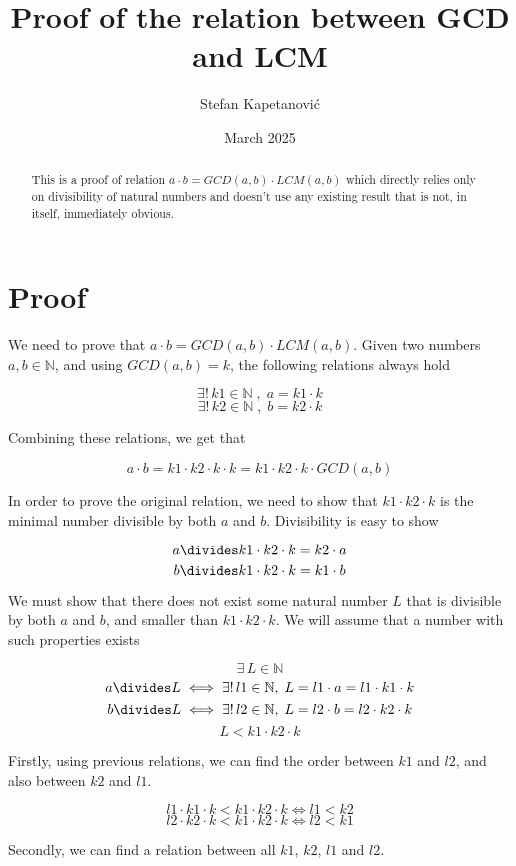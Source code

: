 \documentclass{article}
\title{Proof of the relation between GCD and LCM}
\author{ Stefan Kapetanović }
\date{March 2025}
\begin{document}
\maketitle

\begin{abstract}
This is a proof of relation $a \cdot b = GCD(a, b) \cdot LCM(a, b)$ which directly relies only on divisibility of natural numbers and doesn't use any existing result that is not, in itself, immediately obvious.
\end{abstract}

\section{Proof}

We need to prove that $a \cdot b = GCD(a, b) \cdot LCM(a, b)$.
Given two numbers $a, b \in \mathbb{N}$, and using $GCD(a, b) = k$, the following relations always hold

\[ \exists! \, k1 \in \mathbb{N} \; , \; a = k1 \cdot k \]
\[ \exists! \, k2 \in \mathbb{N} \; , \; b = k2 \cdot k \]

Combining these relations, we get that

\[ a \cdot b = k1 \cdot k2 \cdot k \cdot k = k1 \cdot k2 \cdot k \cdot GCD(a, b) \]

In order to prove the original relation, we need to show that $k1 \cdot k2 \cdot k$ is the minimal number divisible by both $a$ and $b$. Divisibility is easy to show

\[ a \divides k1 \cdot k2 \cdot k = k2 \cdot a \]
\[ b \divides k1 \cdot k2 \cdot k = k1 \cdot b \]

We must show that there does not exist some natural number $L$ that is divisible by both $a$ and $b$, and smaller than $k1 \cdot k2 \cdot k$. We will assume that a number with such properties exists

\[ \exists \, L \in \mathbb{N} \]
\[ a \divides L \iff \exists! \, l1 \in \mathbb{N} , \; L = l1 \cdot a = l1 \cdot k1 \cdot k \]
\[ b \divides L \iff \exists! \, l2 \in \mathbb{N}, \; L = l2 \cdot b = l2 \cdot k2 \cdot k \]
\[ L < k1 \cdot k2 \cdot k \]

Firstly, using previous relations, we can find the order between $k1$ and $l2$, and also between $k2$ and $l1$.

\[ l1 \cdot k1 \cdot k < k1 \cdot k2 \cdot k \iff l1 < k2 \]
\[ l2 \cdot k2 \cdot k < k1 \cdot k2 \cdot k \iff l2 < k1 \]

Secondly, we can find a relation between all $k1$, $k2$, $l1$ and $l2$.
\end{document}
